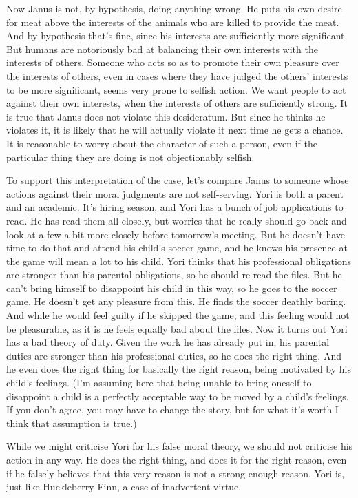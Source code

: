 \documentclass[
  10pt,
  letterpaper,
  twoside]{scrbook}
\begin{document}
Now {Janus} is not, by hypothesis, doing anything wrong. He puts his own
desire for meat above the interests of the animals who are killed to
provide the meat. And by hypothesis that's fine, since his interests are
sufficiently more significant. But humans are notoriously bad at
balancing their own interests with the interests of others. Someone who
acts so as to promote their own pleasure over the interests of others,
even in cases where they have judged the others' interests to be more
significant, seems very prone to selfish action. We want people to act
against their own interests, when the interests of others are
sufficiently strong. It is true that {Janus} does not violate this
desideratum. But since he thinks he violates it, it is likely that he
will actually violate it next time he gets a chance. It is reasonable to
worry about the character of such a person, even if the particular thing
they are doing is not objectionably selfish.

To support this interpretation of the case, let's compare {Janus} to
someone whose actions against their moral judgments are not
self-serving. {Yori} is both a parent and an academic. It's hiring
season, and {Yori} has a bunch of job applications to read. He has read
them all closely, but worries that he really should go back and look at
a few a bit more closely before tomorrow's meeting. But he doesn't have
time to do that and attend his child's soccer game, and he knows his
presence at the game will mean a lot to his child. {Yori} thinks that
his professional obligations are stronger than his parental obligations,
so he should re-read the files. But he can't bring himself to disappoint
his child in this way, so he goes to the soccer game. He doesn't get any
pleasure from this. He finds the soccer deathly boring. And while he
would feel guilty if he skipped the game, and this feeling would not be
pleasurable, as it is he feels equally bad about the files. Now it turns
out {Yori} has a bad theory of duty. Given the work he has already put
in, his parental duties are stronger than his professional duties, so he
does the right thing. And he even does the right thing for basically the
right reason, being motivated by his child's feelings. (I'm assuming
here that being unable to bring oneself to disappoint a child is a
perfectly acceptable way to be moved by a child's feelings. If you don't
agree, you may have to change the story, but for what it's worth I think
that assumption is true.)

While we might criticise {Yori} for his false moral theory, we should
not criticise his action in any way. He does the right thing, and does
it for the right reason, even if he falsely believes that this very
reason is not a strong enough reason. {Yori} is, just like {Huck}leberry
Finn, a case of inadvertent virtue.
\end{document}
